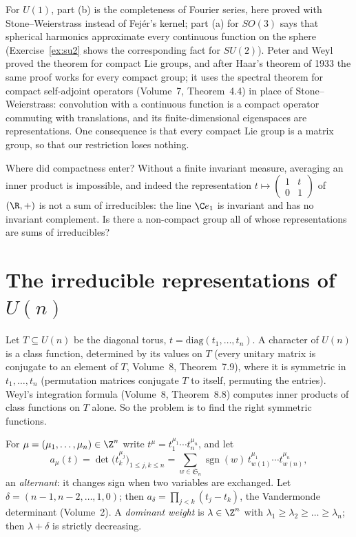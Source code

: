 For $U(1)$, part (b) is the completeness of Fourier series, here proved with Stone--Weierstrass instead of Fejér's kernel; part (a) for $SO(3)$ says that spherical harmonics approximate every continuous function on the sphere (Exercise~\ref{ex:su2}
shows the corresponding fact for $SU(2)$). Peter and Weyl proved the theorem for compact Lie groups, and after Haar's theorem of 1933 the same proof works for every compact group; it uses the spectral theorem for compact self-adjoint operators (Volume~7, Theorem~4.4) in place of Stone--Weierstrass: convolution with a continuous function
is a compact operator commuting with translations, and its finite-dimensional eigenspaces are representations. One consequence is that every compact Lie group is a matrix group, so that our restriction loses nothing.

\begin{think}
Where did compactness enter? Without a finite invariant measure, averaging an inner product is impossible, and indeed the representation $t\mapsto\begin{pmatrix}1&t\\0&1\end{pmatrix}$ of $(\R,+)$ is not a sum of irreducibles: the line $\C e_1$ is
invariant and has no invariant complement. Is there a non-compact group all of whose representations are sums of irreducibles?
\end{think}

\section{The irreducible representations of \texorpdfstring{$U(n)$}{U(n)}}

Let $T\subseteq U(n)$ be the diagonal torus, $t=\mathrm{diag}(t_1,\dots,t_n)$. A character of $U(n)$ is a class function, determined by its values on $T$ (every unitary matrix is conjugate to an element of $T$, Volume~8, Theorem~7.9), where it is
symmetric in $t_1,\dots,t_n$ (permutation matrices conjugate $T$ to itself, permuting the entries). Weyl's integration formula (Volume~8, Theorem~8.8) computes inner products of class functions on $T$ alone. So the problem is to find the right symmetric functions.

For $\mu=(\mu_1,\dots,\mu_n)\in\Z^n$ write $t^\mu=t_1^{\mu_1}\cdots t_n^{\mu_n}$, and let
\[
a_\mu(t)=\det\bigl(t_k^{\mu_j}\bigr)_{1\le j,k\le n}=\sum_{w\in\mathfrak S_n}\operatorname{sgn}(w)\,t_{w(1)}^{\mu_1}\cdots t_{w(n)}^{\mu_n},
\]
an \emph{alternant}: it changes sign when two variables are exchanged. Let $\delta=(n-1,n-2,\dots,1,0)$; then $a_\delta=\prod_{j<k}(t_j-t_k)$, the Vandermonde determinant (Volume~2). A \emph{dominant weight} is $\lambda\in\Z^n$ with $\lambda_1\ge\lambda_2\ge\dots\ge\lambda_n$;
then $\lambda+\delta$ is strictly decreasing.

